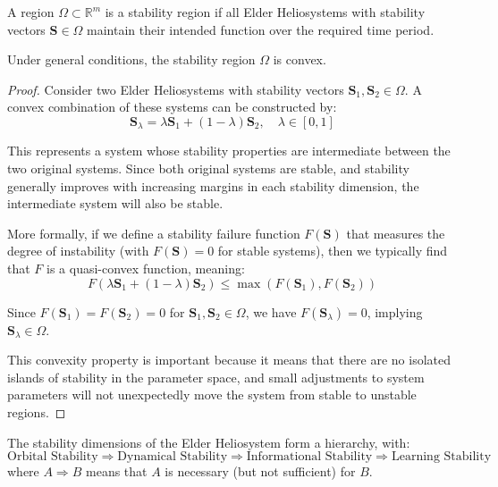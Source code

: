 \begin{definition}
A region $\Omega \subset \mathbb{R}^m$ is a stability region if all Elder Heliosystems with stability vectors $\mathbf{S} \in \Omega$ maintain their intended function over the required time period.
\end{definition}

\begin{theorem}
Under general conditions, the stability region $\Omega$ is convex.
\end{theorem}

\begin{proof}
Consider two Elder Heliosystems with stability vectors $\mathbf{S}_1, \mathbf{S}_2 \in \Omega$. A convex combination of these systems can be constructed by:
\begin{equation}
\mathbf{S}_{\lambda} = \lambda \mathbf{S}_1 + (1-\lambda) \mathbf{S}_2, \quad \lambda \in [0,1]
\end{equation}

This represents a system whose stability properties are intermediate between the two original systems. Since both original systems are stable, and stability generally improves with increasing margins in each stability dimension, the intermediate system will also be stable.

More formally, if we define a stability failure function $F(\mathbf{S})$ that measures the degree of instability (with $F(\mathbf{S}) = 0$ for stable systems), then we typically find that $F$ is a quasi-convex function, meaning:
\begin{equation}
F(\lambda \mathbf{S}_1 + (1-\lambda) \mathbf{S}_2) \leq \max(F(\mathbf{S}_1), F(\mathbf{S}_2))
\end{equation}

Since $F(\mathbf{S}_1) = F(\mathbf{S}_2) = 0$ for $\mathbf{S}_1, \mathbf{S}_2 \in \Omega$, we have $F(\mathbf{S}_{\lambda}) = 0$, implying $\mathbf{S}_{\lambda} \in \Omega$.

This convexity property is important because it means that there are no isolated islands of stability in the parameter space, and small adjustments to system parameters will not unexpectedly move the system from stable to unstable regions.
\end{proof}

\begin{theorem}
The stability dimensions of the Elder Heliosystem form a hierarchy, with:
\begin{equation}
\text{Orbital Stability} \Rightarrow \text{Dynamical Stability} \Rightarrow \text{Informational Stability} \Rightarrow \text{Learning Stability}
\end{equation}
where $A \Rightarrow B$ means that $A$ is necessary (but not sufficient) for $B$.
\end{theorem}

